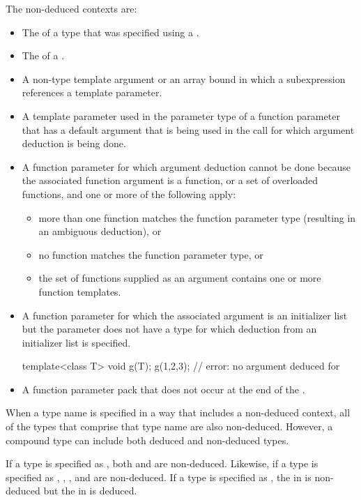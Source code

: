 \pnum
The non-deduced contexts are:

%
\begin{itemize}
\item
The
of a type that was specified using a
.
\item
The  of a .
\item
A non-type template argument or an array bound in which a subexpression
references a template parameter.
\item
A template parameter used in the parameter type of a function parameter that
has a default argument that is being used in the call for which argument
deduction is being done.
\item
A function parameter for which argument deduction cannot be done because the
associated function argument is a function, or a set of overloaded
functions, and one or more of the following apply:
\begin{itemize}
\item
more than one function matches the function parameter type (resulting in
an ambiguous deduction), or
\item
no function matches the function parameter type, or
\item
the set of functions supplied as an argument contains one or more function templates.
\end{itemize}
\item A function parameter for which the associated argument is an initializer
list but the parameter does not have
a type for which deduction from an initializer list is specified.
\begin{example}
\begin{codeblock}
template<class T> void g(T);
g({1,2,3});                 // error: no argument deduced for 
\end{codeblock}
\end{example}
\item A function parameter pack that does not occur at the end of the
.
\end{itemize}

\pnum
When a type name is specified in a way that includes a non-deduced
context, all of the types that comprise that type name are also
non-deduced.
However, a compound type can include both deduced and non-deduced types.
\begin{example}
If a type is specified as
,
both
and
are non-deduced.
Likewise, if a type is specified as
,
,
,
and
are non-deduced.
If a type is specified as
,
the
in
is non-deduced but
the
in
is deduced.
\end{example}

